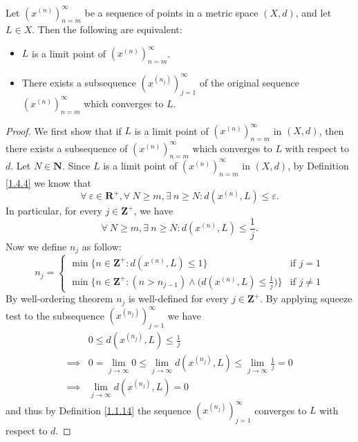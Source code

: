 \begin{proposition}\label{1.4.5}
    Let \((x^{(n)})_{n = m}^\infty\) be a sequence of points in a metric space \((X, d)\), and let \(L \in X\).
    Then the following are equivalent:
    \begin{itemize}
        \item \(L\) is a limit point of \((x^{(n)})_{n = m}^\infty\).
        \item There exists a subsequence \((x^{(n_j)})_{j = 1}^\infty\) of the original sequence \((x^{(n)})_{n = m}^\infty\) which converges to \(L\).
    \end{itemize}
\end{proposition}

\begin{proof}
    We first show that if \(L\) is a limit point of \((x^{(n)})_{n = m}^\infty\) in \((X, d)\), then there exists a subsequence of \((x^{(n)})_{n = m}^\infty\) which converges to \(L\) with respect to \(d\).
    Let \(N \in \mathbf{N}\).
    Since \(L\) is a limit point of \((x^{(n)})_{n = m}^\infty\) in \((X, d)\), by Definition \ref{1.4.4} we know that
    \[
        \forall\ \varepsilon \in \mathbf{R}^+, \forall\ N \geq m, \exists\ n \geq N : d(x^{(n)}, L) \leq \varepsilon.
    \]
    In particular, for every \(j \in \mathbf{Z}^+\), we have
    \[
        \forall\ N \geq m, \exists\ n \geq N : d(x^{(n)}, L) \leq \frac{1}{j}.
    \]
    Now we define \(n_j\) as follow:
    \[
        n_j = \begin{cases}
            \min\big\{n \in \mathbf{Z}^+ : d(x^{(n)}, L) \leq 1\big\}                                           & \text{if } j = 1    \\
            \min\Big\{n \in \mathbf{Z}^+ : (n > n_{j - 1}) \land \big(d(x^{(n)}, L) \leq \frac{1}{j}\big)\Big\} & \text{if } j \neq 1
        \end{cases}
    \]
    By well-ordering theorem \(n_j\) is well-defined for every \(j \in \mathbf{Z}^+\).
    By applying squeeze test to the subsequence \((x^{(n_j)})_{j = 1}^\infty\) we have
    \begin{align*}
                 & 0 \leq d(x^{(n_j)}, L) \leq \frac{1}{j}                                                                     \\
        \implies & 0 = \lim_{j \to \infty} 0 \leq \lim_{j \to \infty} d(x^{(n_j)}, L) \leq \lim_{j \to \infty} \frac{1}{j} = 0 \\
        \implies & \lim_{j \to \infty} d(x^{(n_j)}, L) = 0
    \end{align*}
    and thus by Definition \ref{1.1.14} the sequence \((x^{(n_j)})_{j = 1}^\infty\) converges to \(L\) with respect to \(d\).


\end{proof}
